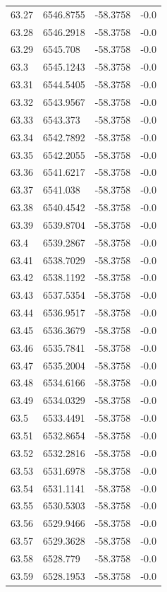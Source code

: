 \begin{table}[H]
\begin{tabular}{llll}
63.27 & 6546.8755 & -58.3758 & -0.0 \\
63.28 & 6546.2918 & -58.3758 & -0.0 \\
63.29 & 6545.708 & -58.3758 & -0.0 \\
63.3 & 6545.1243 & -58.3758 & -0.0 \\
63.31 & 6544.5405 & -58.3758 & -0.0 \\
63.32 & 6543.9567 & -58.3758 & -0.0 \\
63.33 & 6543.373 & -58.3758 & -0.0 \\
63.34 & 6542.7892 & -58.3758 & -0.0 \\
63.35 & 6542.2055 & -58.3758 & -0.0 \\
63.36 & 6541.6217 & -58.3758 & -0.0 \\
63.37 & 6541.038 & -58.3758 & -0.0 \\
63.38 & 6540.4542 & -58.3758 & -0.0 \\
63.39 & 6539.8704 & -58.3758 & -0.0 \\
63.4 & 6539.2867 & -58.3758 & -0.0 \\
63.41 & 6538.7029 & -58.3758 & -0.0 \\
63.42 & 6538.1192 & -58.3758 & -0.0 \\
63.43 & 6537.5354 & -58.3758 & -0.0 \\
63.44 & 6536.9517 & -58.3758 & -0.0 \\
63.45 & 6536.3679 & -58.3758 & -0.0 \\
63.46 & 6535.7841 & -58.3758 & -0.0 \\
63.47 & 6535.2004 & -58.3758 & -0.0 \\
63.48 & 6534.6166 & -58.3758 & -0.0 \\
63.49 & 6534.0329 & -58.3758 & -0.0 \\
63.5 & 6533.4491 & -58.3758 & -0.0 \\
63.51 & 6532.8654 & -58.3758 & -0.0 \\
63.52 & 6532.2816 & -58.3758 & -0.0 \\
63.53 & 6531.6978 & -58.3758 & -0.0 \\
63.54 & 6531.1141 & -58.3758 & -0.0 \\
63.55 & 6530.5303 & -58.3758 & -0.0 \\
63.56 & 6529.9466 & -58.3758 & -0.0 \\
63.57 & 6529.3628 & -58.3758 & -0.0 \\
63.58 & 6528.779 & -58.3758 & -0.0 \\
63.59 & 6528.1953 & -58.3758 & -0.0 \\

\end{tabular}
\end{table}

